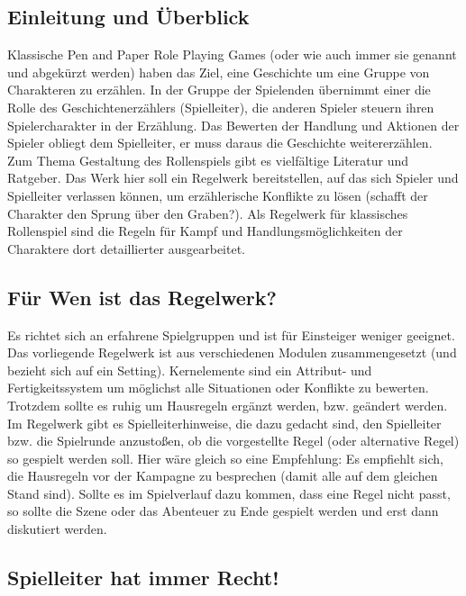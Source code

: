 \documentclass{article}
\begin{document}
\tableofcontents
\newpage
\begin{center}
\section{Einleitung und Überblick}
\end{center}

Klassische Pen and Paper Role Playing Games (oder wie auch immer sie genannt und abgekürzt werden) haben das Ziel,
eine Geschichte um eine Gruppe von Charakteren zu erzählen. In der Gruppe der Spielenden übernimmt einer die Rolle
des Geschichtenerzählers (Spielleiter), die anderen Spieler steuern ihren Spielercharakter in der Erzählung. Das
Bewerten der Handlung und Aktionen der Spieler obliegt dem Spielleiter, er muss daraus die Geschichte weitererzählen.
Zum Thema Gestaltung des Rollenspiels gibt es vielfältige Literatur und Ratgeber. Das Werk hier soll ein Regelwerk
bereitstellen, auf das sich Spieler und Spielleiter verlassen können, um erzählerische Konflikte zu lösen (schafft
der Charakter den Sprung über den Graben?). Als Regelwerk für klassisches Rollenspiel sind die Regeln
für Kampf und Handlungsmöglichkeiten der Charaktere dort detaillierter ausgearbeitet.

\begin{center}
\subsection{Für Wen ist das Regelwerk?}
\end{center}

Es richtet sich an erfahrene Spielgruppen und ist für Einsteiger weniger geeignet. Das vorliegende Regelwerk ist aus
verschiedenen Modulen zusammengesetzt (und bezieht sich auf ein Setting). Kernelemente sind ein Attribut- und
Fertigkeitssystem um möglichst alle Situationen oder Konflikte zu bewerten. Trotzdem sollte es ruhig um
Hausregeln ergänzt werden, bzw. geändert werden. Im Regelwerk gibt es Spielleiterhinweise, die dazu gedacht sind, den
Spielleiter bzw. die Spielrunde anzustoßen, ob die vorgestellte Regel (oder alternative Regel) so gespielt werden soll.
Hier wäre gleich so eine Empfehlung: Es empfiehlt sich, die Hausregeln vor der Kampagne zu besprechen (damit alle auf
dem gleichen Stand sind). Sollte es im Spielverlauf dazu kommen, dass eine Regel nicht passt, so sollte die Szene oder
das Abenteuer zu Ende gespielt werden und erst dann diskutiert werden.

\begin{center}
\subsection{Spielleiter hat immer Recht!}
\end{center}
\end{document}
